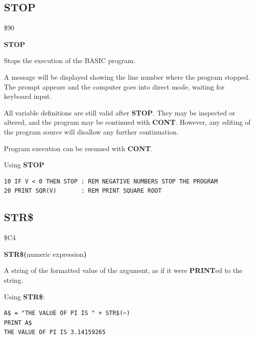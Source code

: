 
\newpage
\subsection{STOP}
\begin{description}[leftmargin=2cm,style=nextline]
\item [Token:] \$90
\item [Format:] {\bf STOP}
\item [Usage:] Stops the execution
               of the BASIC program.

               A message will be displayed showing the line number where the program stopped.
               The  prompt
               appears and the computer goes into direct mode,
               waiting for keyboard input.

\item [Remarks:]
               All variable definitions are still valid after {\bf STOP}.
               They may be inspected or altered, and the
               program may be continued with {\bf CONT}.
               However, any editing of the program source
               will disallow any further continuation.

               Program execution can be resumed with {\bf CONT}.

\item [Example:] Using {\bf STOP}
\begin{tcolorbox}[colback=black,coltext=white]
\verbatimfont{\codefont}
\begin{verbatim}
10 IF V < 0 THEN STOP : REM NEGATIVE NUMBERS STOP THE PROGRAM
20 PRINT SQR(V)       : REM PRINT SQUARE ROOT
\end{verbatim}
\end{tcolorbox}
\end{description}


\newpage
\subsection{STR\$}
\begin{description}[leftmargin=2cm,style=nextline]
\item [Token:] \$C4
\item [Format:] {\bf STR\$(}numeric expression{\bf)}
\item [Returns:] A string of the formatted value of the argument,
               as if it were {\bf PRINT}ed to the string.

\item [Example:] Using {\bf STR\$}:
\begin{tcolorbox}[colback=black,coltext=white]
\verbatimfont{\codefont}
\begin{verbatim}
A$ = "THE VALUE OF PI IS " + STR$(~)
PRINT A$
THE VALUE OF PI IS 3.14159265
\end{verbatim}
\end{tcolorbox}
\end{description}

